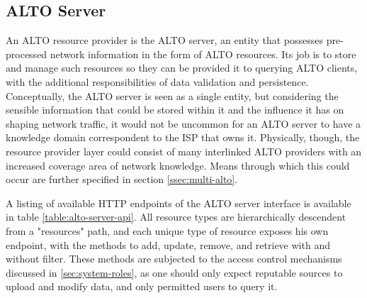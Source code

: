 \subsection{ALTO Server}

    An ALTO resource provider is the ALTO server, an entity that possesses pre-processed network information in the form of ALTO resources.
    Its job is to store and manage such resources so they can be provided it to querying ALTO clients, with the additional responsibilities of data validation and persistence.
    Conceptually, the ALTO server is seen as a single entity, but considering the sensible information that could be stored within it and the influence it has on shaping network traffic, it would not be uncommon for an ALTO server to have a knowledge domain correspondent to the ISP that owns it.
    Physically, though, the resource provider layer could consist of many interlinked ALTO providers with an increased coverage area of network knowledge.
    Means through which this could occur are further specified in section \ref{ssec:multi-alto}.

    A listing of available HTTP endpoints of the ALTO server interface is available in table \ref{table:alto-server-api}.
    All resource types are hierarchically descendent from a "resources" path, and each unique type of resource exposes his own endpoint, with the methods to add, update, remove, and retrieve with and without filter.
    These methods are subjected to the access control mechanisms discussed in \ref{sec:system-roles}, as one should only expect reputable sources to upload and modify data, and only permitted users to query it.

